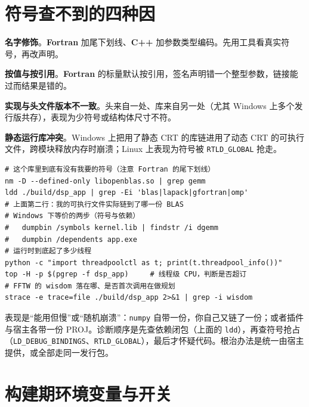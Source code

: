 \documentclass[12pt,a4paper,fontset=fandol]{ctexbook}
\newcommand{\Tp}[1]{\texttt{#1}}
\newcommand{\Lang}[1]{\textsf{\bfseries #1}}
\newcommand{\CPP}{\Lang{C++}}
\newcommand{\FTN}{\Lang{Fortran}}
\begin{document}
\section{符号查不到的四种因}

\textbf{名字修饰}。\FTN{} 加尾下划线、\CPP{} 加参数类型编码。先用工具看真实符号，再改声明。

\textbf{按值与按引用}。\FTN{} 的标量默认按引用，签名声明错一个整型参数，链接能过而结果是错的。

\textbf{实现与头文件版本不一致}。头来自一处、库来自另一处（尤其 Windows 上多个发行版共存），表现为少符号或结构体尺寸不符。

\textbf{静态运行库冲突}。Windows 上把用了静态 CRT 的库链进用了动态 CRT 的可执行文件，跨模块释放内存时崩溃；Linux 上表现为符号被 \Tp{RTLD\_GLOBAL} 抢走。

\begin{lstlisting}[style=shellstyle,caption={定位手段：看符号、看依赖、看运行时线程数}]
# 这个库里到底有没有我要的符号（注意 Fortran 的尾下划线）
nm -D --defined-only libopenblas.so | grep gemm
ldd ./build/dsp_app | grep -Ei 'blas|lapack|gfortran|omp'
# 上面第二行：我的可执行文件实际链到了哪一份 BLAS
# Windows 下等价的两步（符号与依赖）
#   dumpbin /symbols kernel.lib | findstr /i dgemm
#   dumpbin /dependents app.exe
# 运行时到底起了多少线程
python -c "import threadpoolctl as t; print(t.threadpool_info())"
top -H -p $(pgrep -f dsp_app)     # 线程级 CPU，判断是否超订
# FFTW 的 wisdom 落在哪、是否首次调用在做规划
strace -e trace=file ./build/dsp_app 2>&1 | grep -i wisdom
\end{lstlisting}

\begin{warning}[title={一个进程里有两份 BLAS}]
表现是``能用但慢''或``随机崩溃''：\Tp{numpy} 自带一份，你自己又链了一份；或者插件与宿主各带一份 PROJ。诊断顺序是先查依赖闭包（上面的 \Tp{ldd}），再查符号抢占（\Tp{LD\_DEBUG\_BINDINGS}、\Tp{RTLD\_GLOBAL}），最后才怀疑代码。根治办法是统一由宿主提供，或全部走同一发行包。
\end{warning}

\section{构建期环境变量与开关}
\end{document}
